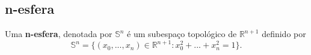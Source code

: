 \subsection{n-esfera}
\label{n-esfera-def}

\begin{defi}
     Uma \textbf{n-esfera}, denotada por $\mathbb{S}^n$ é um subespaço topológico de $\mathbb{R}^{n+1}$ definido por 
     \[\mathbb{S}^n=\{(x_0,...,x_n)\in \mathbb{R}^{n+1}:x_0^2+...+x_n^2=1\}.\]
\end{defi}

